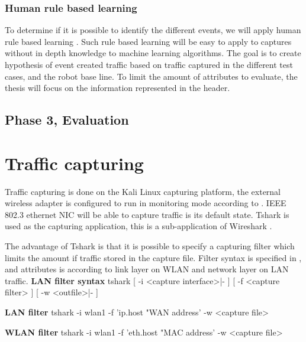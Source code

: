\subsubsection{Human rule based learning}
To determine if it is possible to identify the different events, we will apply human rule based learning \cite{Human-learn:Rule-based}. Such rule based learning will be easy to apply to captures without in depth knowledge to machine learning algorithms. The goal is to create hypothesis of event created traffic based on traffic captured in the different test cases, and the robot base line. 
\newline
To limit the amount of attributes to evaluate, the thesis will focus on the information represented in the header. 


\subsection{Phase 3, Evaluation }

\section{Traffic capturing}
Traffic capturing is done on the Kali Linux capturing platform, the external wireless adapter is configured to run in monitoring mode according to \cite{wifi_adapter_monitor_mode}. IEEE 802.3 ethernet NIC will be able to capture traffic is its default state. Tshark is used as the capturing application, this is a sub-application of Wireshark \cite{wireshark}.

The advantage of Tshark is that it is possible to specify a capturing filter which limits the amount if traffic stored in the capture file. Filter syntax is specified in \cite{wireshark}, and attributes is according to link layer on WLAN and network layer on LAN traffic.
\newline
\newline
\textbf{LAN filter syntax}
\newline
tshark [ -i <capture interface>|- ] [ -f <capture filter> ] [ -w <outfile>|- ]
\newline
\newline

\textbf{LAN filter}
\newline
tshark -i wlan1 -f 'ip.host "WAN address' -w <capture file>
\newline
\newline

\textbf{WLAN filter}
\newline
tshark -i wlan1 -f 'eth.host "MAC address' -w <capture file>
\newline
\newline

